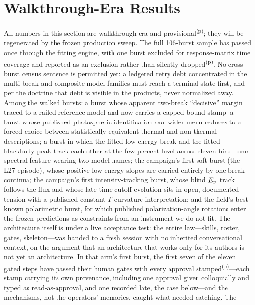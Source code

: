 \documentclass[twocolumn]{aastex631}
\newcommand{\prov}{\textsuperscript{(p)}}   %
\newcommand{\Ep}{E_{\rm p}}
\begin{document}
\section{Walkthrough-Era Results} \label{sec:results}
All numbers in this section are walkthrough-era and provisional\prov;
they will be regenerated by the frozen production sweep. The full
106-burst sample has passed once through the fitting engine, with one
burst excluded for response-matrix time coverage and reported as an
exclusion rather than silently dropped\prov. No cross-burst census
sentence is permitted yet: a ledgered retry debt concentrated in the
multi-break and composite model families must reach a terminal state
first, and per the doctrine that debt is visible in the products, never
normalized away. Among the walked bursts: a burst whose apparent two-break ``decisive''
margin traced to a railed reference model and now carries a capped-bound
stamp; a burst whose published photospheric identification our wider menu
reduces to a forced choice between statistically equivalent thermal and
non-thermal descriptions; a burst in which the fitted low-energy break and
the fitted blackbody peak track each other at the few-percent level across
eleven bins---one spectral feature wearing two model names; the campaign's
first soft burst (the L27 episode), whose positive low-energy slopes are
carried entirely by one-break continua; the campaign's first
intensity-tracking burst, whose blind $\Ep$ track follows the flux and whose
late-time cutoff evolution sits in open, documented tension with a published
constant-$\Gamma$ curvature interpretation; and the field's best-known
polarimetric burst, for which published polarization-angle rotations enter
the frozen predictions as constraints from an instrument we do not fit.
The architecture itself is under a live acceptance test: the entire
law---skills, roster, gates, skeleton---was handed to a fresh session
with no inherited conversational context, on the argument that an
architecture that works only for its authors is not yet an architecture.
In that arm's first burst, the first seven of the eleven gated steps have
passed their human gates with every approval stamped\prov{}---each stamp
carrying its own provenance, including one approval given colloquially and
typed as read-as-approval, and one recorded late, the case below---and the
mechanisms, not the operators' memories, caught what needed catching. The
\end{document}
